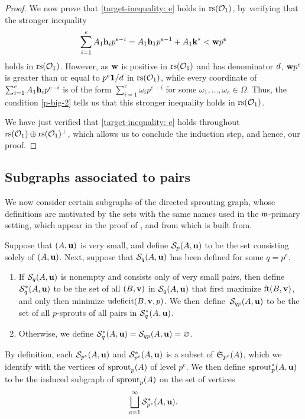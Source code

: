 \documentclass{amsart}
\begin{document}
\begin{proof}
    We now prove that \eqref{target-inequality: e} holds in $\operatorname{rs}(\mathcal{O}_1)$, by verifying that the stronger inequality
    \[ \sum_{i=1}^{e} A_1 \mathbf{h}_i p^{e-i} = A_1 \mathbf{h}_1 p^{e-1} + A_1 \mathbf{k}^{\ast} < \mathbf{w}p^e \]
    holds in $\operatorname{rs}(\mathcal{O}_1)$.
    However, as $\mathbf{w}$ is positive in $\operatorname{rs}(\mathcal{O}_1)$ and has denominator $d$, $\mathbf{w} p^e$ is greater than or equal to $p^e \mathbf{1} / d$ in $\operatorname{rs}(\mathcal{O}_1)$, while every coordinate of $\sum_{i=1}^{e} A_1 \mathbf{h}_i p^{e-i}$ is of the form $\sum_{i=1}^{e} \omega_i  p^{e-i}$ for some $\omega_1, \ldots, \omega_e \in \Omega$.
    Thus, the condition \eqref{p-big-2} tells us that this stronger inequality holds in $\operatorname{rs}(\mathcal{O}_1)$.

    We have just verified that \eqref{target-inequality: e} holds throughout $\operatorname{rs}(\mathcal{O}_1) \oplus \operatorname{rs}(\mathcal{O}_1)^{\perp}$, which allows us to conclude the induction step, and hence, our proof.
\end{proof}


\subsection{Subgraphs associated to pairs}
We now consider certain subgraphs of the directed sprouting graph, whose definitions are motivated by the sets with the same names used in the $\mathfrak{m}$-primary setting, which appear in the proof of , and from which  is built from.

\begin{definition}
   Suppose that $(A,\mathbf{u})$ is very small, and define $\mathcal{S}_p(A,\mathbf{u})$ to be the set consisting solely of $(A,\mathbf{u})$.
   Next, suppose that $\mathcal{S}_q(A,\mathbf{u})$ has been defined for some $q=p^e$.
   \begin{enumerate}
      \item If $\mathcal{S}_q(A,\mathbf{u})$ is nonempty and consists only of very small pairs, then define $\mathcal{S}^{\ast}_q(A,\mathbf{u})$ to be the set of all $(B,\mathbf{v})$ in $\mathcal{S}_q(A,\mathbf{u})$ that first maximize $\operatorname{ft}(B, \mathbf{v})$, and only then minimize $\operatorname{udeficit}(B,\mathbf{v},p)$.  We then~define~$\mathcal{S}_{qp}(A,\mathbf{u})$ to be the set of all $p$-sprouts of all pairs in $\mathcal{S}^{\ast}_q(A,\mathbf{u})$.
      \item Otherwise, we define $\mathcal{S}_q^{\ast}(A,\mathbf{u})=\mathcal{S}_{qp}(A,\mathbf{u}) = \varnothing$.
   \end{enumerate}
   By definition, each $\mathcal{S}_{p^e}(A,\mathbf{u})$ and $\mathcal{S}^{\ast}_{p^e}(A,\mathbf{u})$ is a subset of $\mathfrak{S}_{p^e}(A)$, which we identify with the vertices of $\operatorname{sprout}_p(A)$ of level $p^e$.
   We then define $\operatorname{sprout}_p^{\ast}(A,\mathbf{u})$ to be the induced subgraph of $\operatorname{sprout}_p(A)$ on the set of vertices
   \[ \bigsqcup_{e=1}^{\infty} \mathcal{S}^{\ast}_{p^e}(A,\mathbf{u}). \]
\end{definition}
\end{document}
